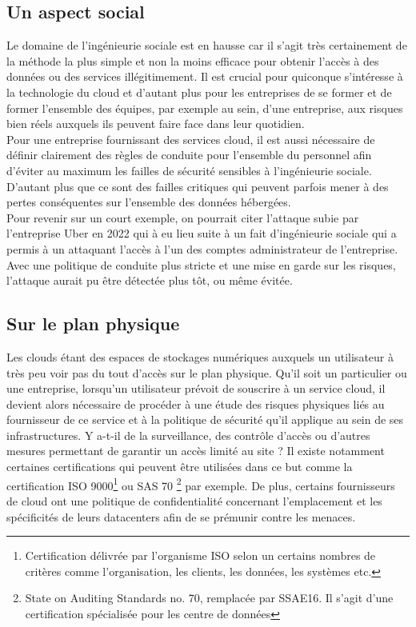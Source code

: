\documentclass[a4paper, 12pt]{article}
\begin{document}
      \subsection{Un aspect social}
      Le domaine de l'ingénieurie sociale est en hausse car il s'agit très
      certainement de la méthode la plus simple et non la moins efficace pour
      obtenir l'accès à des données ou des services illégitimement. Il est
      crucial pour quiconque s'intéresse à la technologie du cloud et d'autant
      plus pour les entreprises de se former et de former l'ensemble des
      équipes, par exemple au sein, d'une entreprise, aux risques bien réels
      auxquels ils peuvent faire face dans leur quotidien. \\

      Pour une entreprise fournissant des services cloud, il est aussi
      nécessaire de définir clairement des règles de conduite pour l'ensemble du
      personnel afin d'éviter au maximum les failles de sécurité sensibles à
      l'ingénieurie sociale. D'autant plus que ce sont des failles critiques qui
      peuvent parfois mener à des pertes conséquentes sur l'ensemble des données
      hébergées. \\

      Pour revenir sur un court exemple, on pourrait citer l'attaque subie par
      l'entreprise Uber en 2022 qui à eu lieu suite à un fait d'ingénieurie
      sociale qui a permis à un attaquant l'accès à l'un des comptes
      administrateur de l'entreprise. Avec une politique de conduite plus
      stricte et une mise en garde sur les risques, l'attaque aurait pu être
      détectée plus tôt, ou même évitée. \\

    \subsection{Sur le plan physique}
      Les clouds étant des espaces de stockages numériques auxquels un
      utilisateur à très peu voir pas du tout d'accès sur le plan physique.
      Qu'il soit un particulier ou une entreprise, lorsqu'un utilisateur
      prévoit de souscrire à un service cloud, il devient alors nécessaire de
      procéder à une étude des risques physiques liés au fournisseur de
      ce service et à la politique de sécurité qu'il applique au sein de ses
      infrastructures. Y a-t-il de la surveillance, des contrôle d'accès ou
      d'autres mesures permettant de garantir un accès limité au site ? Il
      existe notamment certaines certifications qui peuvent être utilisées dans
      ce but comme la certification ISO 9000\footnote{Certification délivrée
      par l'organisme ISO selon un certains nombres de critères comme
      l'organisation, les clients, les données, les systèmes etc.} ou SAS 70
      \footnote{State on Auditing Standards no. 70, remplacée par SSAE16. Il
      s'agit d'une certification spécialisée pour les centre de données} par
      exemple. De plus, certains fournisseurs de cloud ont une politique de
      confidentialité concernant l'emplacement et les spécificités de leurs
      datacenters afin de se prémunir contre les menaces. \\
\end{document}
